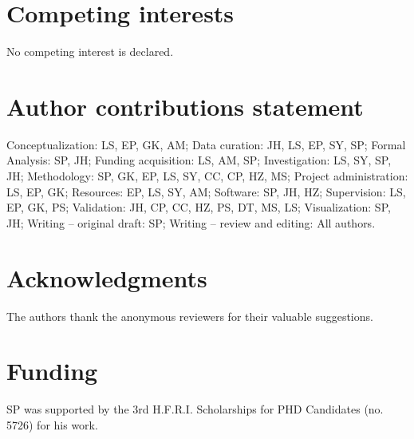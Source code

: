 \documentclass[unnumsec,webpdf,contemporary,large]{oup-authoring-template}%
\theoremstyle{thmstyleone}%
\theoremstyle{thmstyletwo}%
\theoremstyle{thmstylethree}%
\begin{document}
\section{Competing interests}
No competing interest is declared.

\section{Author contributions statement}
Conceptualization: LS, EP, GK, AM;
Data curation: JH, LS, EP, SY, SP;
Formal Analysis: SP, JH;
Funding acquisition: LS, AM, SP;
Investigation: LS, SY, SP, JH;
Methodology: SP, GK, EP, LS, SY, CC, CP, HZ, MS;
Project administration: LS, EP, GK;
Resources: EP, LS, SY, AM;
Software: SP, JH, HZ;
Supervision: LS, EP, GK, PS;
Validation: JH, CP, CC, HZ, PS, DT, MS, LS;
Visualization: SP, JH;
Writing – original draft: SP;
Writing – review and editing: All authors.

\section{Acknowledgments}
The authors thank the anonymous reviewers for their valuable suggestions.

\section{Funding}
SP was supported by the 3rd H.F.R.I. Scholarships for PHD Candidates (no. 5726) for his work.





%
%
\end{document}
